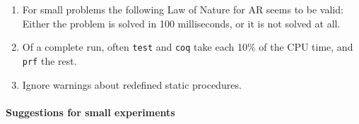 \documentclass{article}
\newcommand{\weg}[1]{}
\begin{document}
\begin{enumerate}
\item For small problems the following Law of Nature for AR seems to
  be valid: Either the problem is solved in 100 milliseconds, or it is
  not solved at all.
\item Of a complete run, often \texttt{test} and \texttt{coq} take 
each 10\% of the CPU time, and \texttt{prf} the rest.
\weg{
\item Strategies can be programmed with the binary predicate
  \texttt{enabled(<control>,<guard>)} and the ternary predicate
  \texttt{next(<control>,<guard>,<new\_guard>)}. This requires some
  skill. It may cause false negatives and even runtime errors. False
  positives have not happened in practice, but could happen in
  principle, f.e., after \texttt{assert(false)} when the search has
  started.  False positives NEVER EVER pass the typecheck of Coq. :-)
 \item Launch \texttt{grep enabled *.in} to see which examples use
   strategies and how. Never use a strategy when you do not understand
   why the CL prover doesn't find the proof.
} %
\item Ignore warnings about redefined static procedures.
\end{enumerate}

\paragraph{Suggestions for small experiments}
\end{document}
